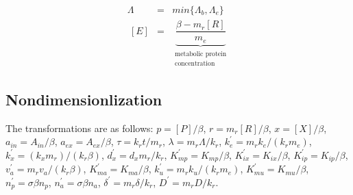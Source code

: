 \documentclass[11pt]{article}
\begin{document}
{\begin{eqnarray}
	\Lambda &=& min\{\Lambda_{b}, \Lambda_{e}\} \\ 
   ~[E] &=& \underbrace{\dfrac{\beta-m_r[R]}{m_e}}_{\substack{\text{metabolic protein} \\ \text{concentration}}} \label{eq:metab_prot_conc2}
  \end{eqnarray}
  
  \subsection{Nondimensionlization}
  The transformations are as follows:
$p=[P]/\beta$, $r=m_r[R]/\beta$, $x=[X]/\beta$, $a_{in}=A_{in}/\beta$, $a_{ex}=A_{ex}/\beta$, $\tau=k_r t/m_r$, $\lambda=m_r\Lambda/k_r$, $k_e^\prime=m_rk_e/(k_rm_e)$, $k_x^\prime=(k_xm_r)/(k_r\beta)$, $d_x^\prime = d_xm_r/k_r$, $K_{mp}^\prime = K_{mp}/\beta$, $K_{ix}^\prime = K_{ix}/\beta$, $K_{ip}^{\prime}=K_{ip}/\beta$, $v_a^\prime=m_rv_a/(k_r\beta)$, $K_{ma}^\prime=K_{ma}/\beta$,  $k_{u}^{\prime}=m_rk_u/(k_rm_e)$, $K_{mu}^{\prime}=K_{mu}/\beta$, $n_p^\prime=\sigma  \beta n_p$, $n_a^\prime=\sigma  \beta n_a$, $ \delta^\prime= m_r \delta/k_r$, $ D^\prime= m_r D/k_r$.

}
\end{document}
